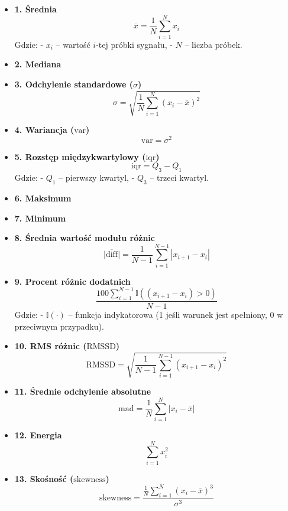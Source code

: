 \documentclass[12pt,titlepage]{article}
\begin{document}
\begin{itemize}
    \item \textbf{1. Średnia}  
    \[
    \overline{x} = \frac{1}{N} \sum_{i=1}^{N} x_i
    \]
    Gdzie:  
    - \( x_i \) – wartość \( i \)-tej próbki sygnału,  
    - \( N \) – liczba próbek.

    \item \textbf{2. Mediana }  
    \item \textbf{3. Odchylenie standardowe ($\sigma$)}  
    \[
    \sigma = \sqrt{\frac{1}{N} \sum_{i=1}^{N} (x_i - \overline{x})^2}
    \]

    \item \textbf{4. Wariancja ($\text{var}$)}  
    \[
    \text{var} = \sigma^2
    \]

    \item \textbf{5. Rozstęp międzykwartylowy ($\text{iqr}$)}  
    \[
    \text{iqr} = Q_3 - Q_1
    \]
    Gdzie:  
    - \( Q_1 \) – pierwszy kwartyl,  
    - \( Q_3 \) – trzeci kwartyl.

    \item \textbf{6. Maksimum}  

    \item \textbf{7. Minimum}  


    \item \textbf{8. Średnia wartość modułu różnic }  
    \[
    \overline{|\text{diff}|} = \frac{1}{N-1} \sum_{i=1}^{N-1} |x_{i+1} - x_i|
    \]

    \item \textbf{9. Procent różnic dodatnich}  
    \[
    \frac{100 \sum_{i=1}^{N-1} \mathbb{I}((x_{i+1} - x_i) > 0)}{N-1}
    \]
    Gdzie:  
    - \( \mathbb{I}(\cdot) \) – funkcja indykatorowa (1 jeśli warunek jest spełniony, 0 w przeciwnym przypadku).

    \item \textbf{10. RMS różnic ($\text{RMSSD}$)}  
    \[
    \text{RMSSD} = \sqrt{\frac{1}{N-1} \sum_{i=1}^{N-1} (x_{i+1} - x_i)^2}
    \]

    \item \textbf{11. Średnie odchylenie absolutne}  
    \[
    \text{mad} = \frac{1}{N} \sum_{i=1}^{N} |x_i - \overline{x}|
    \]

    \item \textbf{12. Energia}  
    \[
    \sum_{i=1}^{N} x_i^2
    \]

    \item \textbf{13. Skośność ($\text{skewness}$)}  
    \[
    \text{skewness} = \frac{\frac{1}{N} \sum_{i=1}^{N} (x_i - \overline{x})^3}{\sigma^3}
    \]


\end{itemize}
\end{document}
